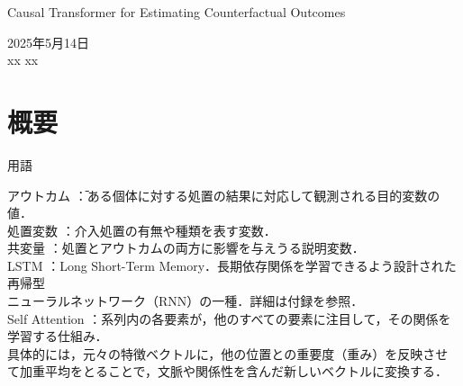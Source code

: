 \documentclass[dvipdfmx]{jreport}
\begin{document}
\begin{center}
    \large{Causal Transformer for Estimating Counterfactual Outcomes}
\end{center}

\begin{flushright}
    2025年5月14日\\
    xx xx
\end{flushright}

\section{概要}
\begin{itembox}[l]{\large{用語}}
    \begin{tabbing}
        \hspace{15pt} \raisebox{0.5ex}{\tiny $\bullet$} アウトカム \hspace{13pt}\=：ある個体に対する処置の結果に対応して観測される目的変数の値．\\[0.5em] 
        \hspace{15pt} \raisebox{0.5ex}{\tiny $\bullet$} 処置変数 \>：介入処置の有無や種類を表す変数．\\[0.5em] 
        \hspace{15pt} \raisebox{0.5ex}{\tiny $\bullet$} 共変量 \>：処置とアウトカムの両方に影響を与えうる説明変数．\\[0.5em] 
        \hspace{15pt} \raisebox{0.5ex}{\tiny $\bullet$} LSTM \>：Long Short-Term Memory．長期依存関係を学習できるよう設計された再帰型\\[0.5em]\>\hspace{6.5pt}ニューラルネットワーク（RNN）の一種．詳細は付録を参照．\\[0.5em] 
        \hspace{15pt} \raisebox{0.5ex}{\tiny $\bullet$} Self Attention \>：系列内の各要素が，他のすべての要素に注目して，その関係を学習する仕組み．\\[0.5em]\>\hspace{6.5pt}具体的には，元々の特徴ベクトルに，他の位置との重要度（重み）を反映させ\\[0.5em]\>\hspace{6.5pt}て加重平均をとることで，文脈や関係性を含んだ新しいベクトルに変換する．
    \end{tabbing}
\end{itembox}
\end{document}
